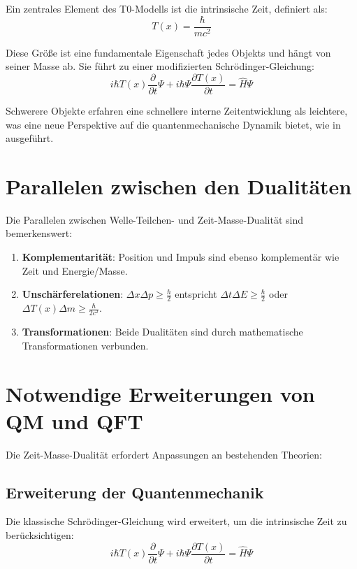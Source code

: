 \documentclass[a4paper,12pt]{article}
\newcommand{\Tfield}{T(x)}
\begin{document}
	Ein zentrales Element des T0-Modells ist die intrinsische Zeit, definiert als:
	\begin{equation}
		\Tfield = \frac{\hbar}{m c^2}
	\end{equation}
	
	Diese Größe ist eine fundamentale Eigenschaft jedes Objekts und hängt von seiner Masse ab. Sie führt zu einer modifizierten Schrödinger-Gleichung:
	\begin{equation}
		i\hbar \Tfield \frac{\partial}{\partial t} \Psi + i\hbar \Psi \frac{\partial \Tfield}{\partial t} = \hat{H} \Psi
	\end{equation}
	
	Schwerere Objekte erfahren eine schnellere interne Zeitentwicklung als leichtere, was eine neue Perspektive auf die quantenmechanische Dynamik bietet, wie in \cite{pascher_quantum_2025} ausgeführt.
	
	\section{Parallelen zwischen den Dualitäten}
	
	Die Parallelen zwischen Welle-Teilchen- und Zeit-Masse-Dualität sind bemerkenswert:
	\begin{enumerate}
		\item \textbf{Komplementarität}: Position und Impuls sind ebenso komplementär wie Zeit und Energie/Masse.
		\item \textbf{Unschärferelationen}: \(\Delta x \Delta p \geq \frac{\hbar}{2}\) entspricht \(\Delta t \Delta E \geq \frac{\hbar}{2}\) oder \(\Delta \Tfield \Delta m \geq \frac{\hbar}{2c^2}\).
		\item \textbf{Transformationen}: Beide Dualitäten sind durch mathematische Transformationen verbunden.
	\end{enumerate}
	
	\section{Notwendige Erweiterungen von QM und QFT}
	
	Die Zeit-Masse-Dualität erfordert Anpassungen an bestehenden Theorien:
	
	\subsection{Erweiterung der Quantenmechanik}
	
	Die klassische Schrödinger-Gleichung wird erweitert, um die intrinsische Zeit zu berücksichtigen:
	\begin{equation}
		i\hbar \Tfield \frac{\partial}{\partial t} \Psi + i\hbar \Psi \frac{\partial \Tfield}{\partial t} = \hat{H} \Psi
	\end{equation}
	
\end{document}
